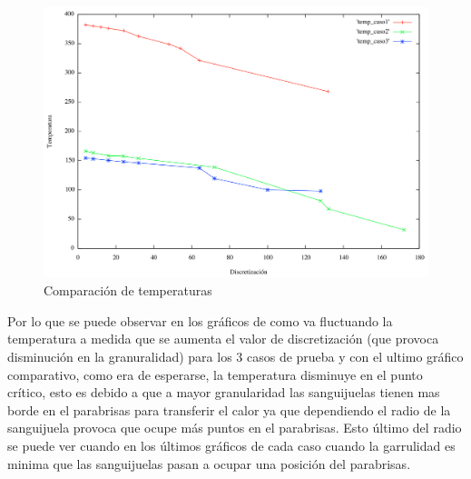 \begin{figure}[htb]
\begin{center}
        \includegraphics[scale=0.5]{imagenes/comparacion_temperatura.png}
                \caption{Comparación de temperaturas}
        \end{center}

\end{figure}

Por lo que se puede observar en los gráficos de como va fluctuando la temperatura a medida que se aumenta el valor de discretización (que provoca disminución en la granuralidad) para los 3 casos de prueba y con el ultimo gráfico comparativo, como era de esperarse, la temperatura disminuye en el punto crítico, esto es debido a que a mayor granularidad las sanguijuelas tienen mas borde en el parabrisas para transferir el calor ya que dependiendo el radio de la sanguijuela provoca que ocupe más puntos en el parabrisas. Esto último del radio se puede ver cuando en los últimos gráficos de cada caso cuando la garrulidad es minima que las sanguijuelas pasan a ocupar una posición del parabrisas.

\newpage

